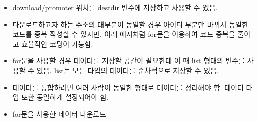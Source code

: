 \documentclass[
]{article}
\begin{document}
\begin{itemize}
\item
  download/promoter 위치를 destdir 변수에 저장하고 사용할 수 있음.
\item
  다운로드하고자 하는 주소의 대부분이 동일할 경우 아이디 부분만 바꿔서
  동일한 코드를 중복 작성할 수 있지만, 아래 예시처럼 for문을 이용하여
  코드 중복을 줄이고 효율적인 코딩이 가능함.
\item
  for문을 사용할 경우 데이터를 저장할 공간이 필요한데 이 때 list 형태의
  변수를 사용할 수 있음. list는 모든 타입의 데이터를 순차적으로 저장할
  수 있음.
\item
  데이터를 통합하려면 여러 사람이 동일한 형태로 데이터를 정리해야 함.
  데이터 타입 또한 동일하게 설정되어야 함.
\item
  for문을 사용한 데이터 다운로드
\end{itemize}
\end{document}
